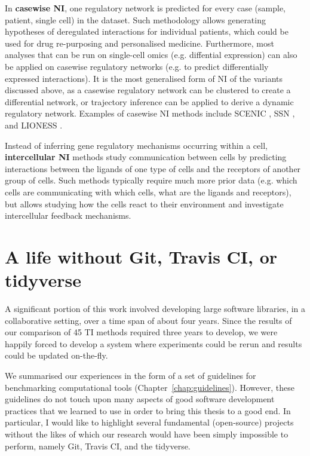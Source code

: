 In \textbf{casewise NI}, one regulatory network is predicted for every case (sample, patient, single cell) in the dataset. Such methodology allows generating hypotheses of deregulated interactions for individual patients, which could be used for drug re-purposing and personalised medicine. Furthermore, most analyses that can be run on single-cell omics (e.g. diffential expression) can also be applied on casewise regulatory networks (e.g. to predict differentially expressed interactions).
It is the most generalised form of NI of the variants discussed above, as a casewise regulatory network can be clustered to create a differential network, or trajectory inference can be applied to derive a dynamic regulatory network. Examples of casewise NI methods include SCENIC \cite{aibar_scenicsinglecellregulatory_2017}, SSN \cite{liu_personalizedcharacterizationdiseases_2016}, and LIONESS \cite{kuijjer_estimatingsamplespecificregulatory_2019}.

Instead of inferring gene regulatory mechanisms occurring within a cell, \textbf{intercellular NI} methods \cite{efremova_cellphonedbv2inferring_2019,browaeys_nichenetmodelingintercellular_2019} study communication between cells by predicting interactions between the ligands of one type of cells and the receptors of another group of cells. Such methods typically require much more prior data (e.g. which cells are communicating with which cells, what are the ligands and receptors), but allows studying how the cells react to their environment and investigate intercellular feedback mechanisms. 



\section{A life without Git, Travis CI, or tidyverse}
A significant portion of this work involved developing large software libraries, in a collaborative setting, over a time span of about four years. Since the results of our comparison of 45 TI methods required three years to develop, we were happily forced to develop a system where experiments could be rerun and results could be updated on-the-fly.

We summarised our experiences in the form of a set of guidelines for benchmarking computational tools (Chapter~\ref{chap:guidelines}). However, these guidelines do not touch upon many aspects of good software development practices that we learned to use in order to bring this thesis to a good end. In particular, I would like to highlight several  fundamental (open-source) projects without the likes of which our research would have been simply impossible to perform, namely Git, Travis CI, and the tidyverse.

